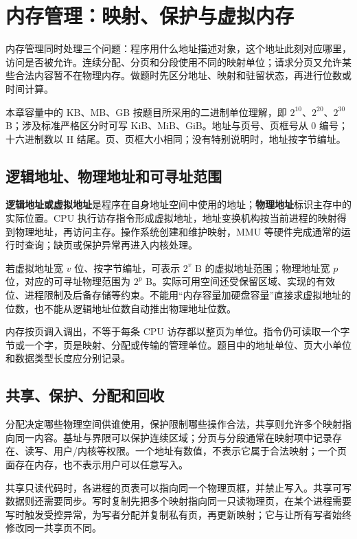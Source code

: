 \chapter{内存管理：映射、保护与虚拟内存}\label{os-ch5}

内存管理同时处理三个问题：程序用什么地址描述对象，这个地址此刻对应哪里，访问是否被允许。连续分配、分页和分段使用不同的映射单位；请求分页又允许某些合法内容暂不在物理内存。做题时先区分地址、映射和驻留状态，再进行位数或时间计算。

本章容量中的 KB、MB、GB 按题目所采用的二进制单位理解，即 \(2^{10}\)、\(2^{20}\)、\(2^{30}\) B；涉及标准严格区分时可写 KiB、MiB、GiB。地址与页号、页框号从 0 编号；十六进制数以 H 结尾。页、页框大小相同；没有特别说明时，地址按字节编址。

\section{逻辑地址、物理地址和可寻址范围}\label{os-5-1}

\textbf{逻辑地址或虚拟地址}是程序在自身地址空间中使用的地址；\textbf{物理地址}标识主存中的实际位置。CPU 执行访存指令形成虚拟地址，地址变换机构按当前进程的映射得到物理地址，再访问主存。操作系统创建和维护映射，MMU 等硬件完成通常的运行时查询；缺页或保护异常再进入内核处理。

若虚拟地址宽 \(v\) 位、按字节编址，可表示 \(2^v\) B 的虚拟地址范围；物理地址宽 \(p\) 位，对应的可寻址物理范围为 \(2^p\) B。实际可用空间还受保留区域、实现的有效位、进程限制及后备存储等约束。不能用``内存容量加硬盘容量''直接求虚拟地址的位数，也不能从逻辑地址位数自动推出物理地址位数。

内存按页调入调出，不等于每条 CPU 访存都以整页为单位。指令仍可读取一个字节或一个字，页是映射、分配或传输的管理单位。题目中的地址单位、页大小单位和数据类型长度应分别记录。

\section{共享、保护、分配和回收}\label{os-5-2}

分配决定哪些物理空间供谁使用，保护限制哪些操作合法，共享则允许多个映射指向同一内容。基址与界限可以保护连续区域；分页与分段通常在映射项中记录存在、读写、用户/内核等权限。一个地址有数值，不表示它属于合法映射；一个页面存在内存，也不表示用户可以任意写入。

共享只读代码时，各进程的页表可以指向同一个物理页框，并禁止写入。共享可写数据则还需要同步。写时复制先把多个映射指向同一只读物理页，在某个进程需要写时触发受控异常，为写者分配并复制私有页，再更新映射；它与让所有写者始终修改同一共享页不同。

